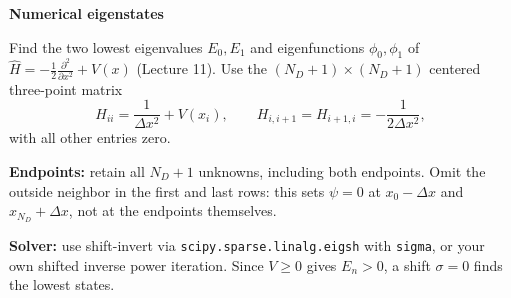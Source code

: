 \begin{solution}
\end{solution}

\begin{problem}[10]
  \textbf{Numerical eigenstates}

  Find the two lowest eigenvalues $E_0,E_1$ and eigenfunctions $\phi_0,\phi_1$ of $\hat H=-\frac12\frac{\partial^2}{\partial x^2}+V(x)$ (Lecture 11).
  Use the $(N_D+1)\times(N_D+1)$ centered three-point matrix
  \begin{equation}
    H_{ii}=\frac{1}{\Delta x^2}+V(x_i), \qquad
    H_{i,i+1}=H_{i+1,i}=-\frac{1}{2\Delta x^2},
  \end{equation}
  with all other entries zero.

  \textbf{Endpoints:} retain all $N_D+1$ unknowns, including both endpoints.
  Omit the outside neighbor in the first and last rows: this sets $\psi=0$ at $x_0-\Delta x$ and $x_{N_D}+\Delta x$, not at the endpoints themselves.

  \textbf{Solver:} use shift-invert via \texttt{scipy.sparse.linalg.eigsh} with \texttt{sigma}, or your own shifted inverse power iteration.
  Since $V\geq0$ gives $E_n>0$, a shift $\sigma=0$ finds the lowest states.


\end{problem}
